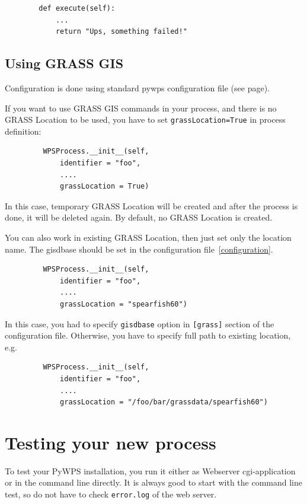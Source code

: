 \documentclass[a4paper,11pt]{report}
\begin{document}
\begin{verbatim}
        def execute(self):
            ...
            return "Ups, something failed!"
\end{verbatim}
    

\section{Using GRASS GIS}

Configuration is done using standard pywps configuration file (see
page\pageref{configuration}).


If you want to use GRASS GIS commands in your process, and there is no
GRASS Location to be used, you have to set \texttt{grassLocation=True} in
process definition:

\begin{verbatim}
         WPSProcess.__init__(self,
             identifier = "foo",
             ....
             grassLocation = True)
\end{verbatim}

In this case, temporary GRASS Location will be created and after the
process is done, it will be deleted again. By default, no GRASS Location is
created.

You can also work in existing GRASS Location, then just set only the location
name. The gisdbase should be set in the configuration
file~\ref{configuration}.
\begin{verbatim}
         WPSProcess.__init__(self,
             identifier = "foo",
             ....
             grassLocation = "spearfish60")
\end{verbatim}
In this case, you had to specify \texttt{gisdbase} option in
\texttt{[grass]} section of the configuration file. Otherwise, you have to
specify full path to existing location, e.g.
\begin{verbatim}
         WPSProcess.__init__(self,
             identifier = "foo",
             ....
             grassLocation = "/foo/bar/grassdata/spearfish60")
\end{verbatim}

\chapter{Testing your new process}

To test your PyWPS installation, you run it either as Webserver
cgi-application or in the command line directly. It is always good to start
with the command line test, so do not have to check \texttt{error.log} of
the web server.
\end{document}
